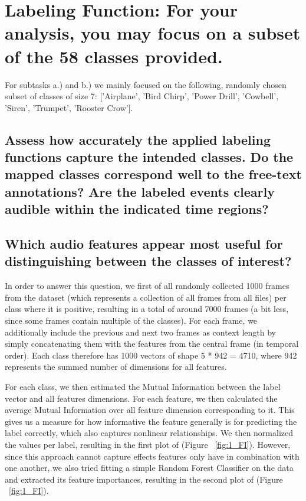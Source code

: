 
\section{Labeling Function: {\normalfont\normalsize For your analysis, you may focus on a subset of the 58 classes provided.}}
\label{sec:Labeling Function}

For subtasks a.) and b.) we mainly focused on the following, randomly chosen subset of classes of size 7: ['Airplane', 'Bird Chirp', 'Power Drill', 'Cowbell', 'Siren', 'Trumpet', 'Rooster Crow'].


\subsection{Assess how accurately the applied labeling functions capture the intended classes. Do the mapped classes correspond well to the free-text annotations? Are the labeled events clearly audible within the indicated time regions?}
\label{sec:Labeling Function:a}


\subsection{Which audio features appear most useful for distinguishing between the classes of interest? }
\label{sec:Labeling Function:b}

In order to answer this question, we first of all randomly collected 1000 frames from the dataset (which represents a collection of all frames from all files) per class where it is positive, resulting in a total of around 7000 frames (a bit less, since some frames contain multiple of the classes). For each frame, we additionally include the previous and next two frames as context length by simply concatenating them with the features from the central frame (in temporal order). Each class therefore has 1000 vectors of shape 5 * 942 = 4710, where 942 represents the summed number of dimensions for all features.

For each class, we then estimated the Mutual Information between the label vector and all features dimensions. For each feature, we then calculated the average Mutual Information over all feature dimension corresponding to it. This gives us a measure for how informative the feature generally is for predicting the label correctly, which also captures nonlinear relationships. We then normalized the values per label, resulting in the first plot of (Figure ~\ref{fig:1_FI}). However, since this approach cannot capture effects features only have in combination with one another, we also tried fitting a simple Random Forest Classifier on the data and extracted its feature importances, resulting in the second plot of (Figure ~\ref{fig:1_FI}).

